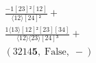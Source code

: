\documentclass[varwidth, border=5pt]{standalone}
\begin{document}
\begin{my}
$\begin{gathered}
\scriptscriptstyle\frac{-1[23]²[12]}{⟨12⟩[24]²} +\\
\scriptscriptstyle\frac{1⟨13⟩[12]²[23][34]}{⟨12⟩⟨23⟩[24]³} +\\
\scriptscriptstyle(3214𝟓,\;\text{False},\;-) \phantom{+}
\end{gathered}$
\end{my}
\end{document}
